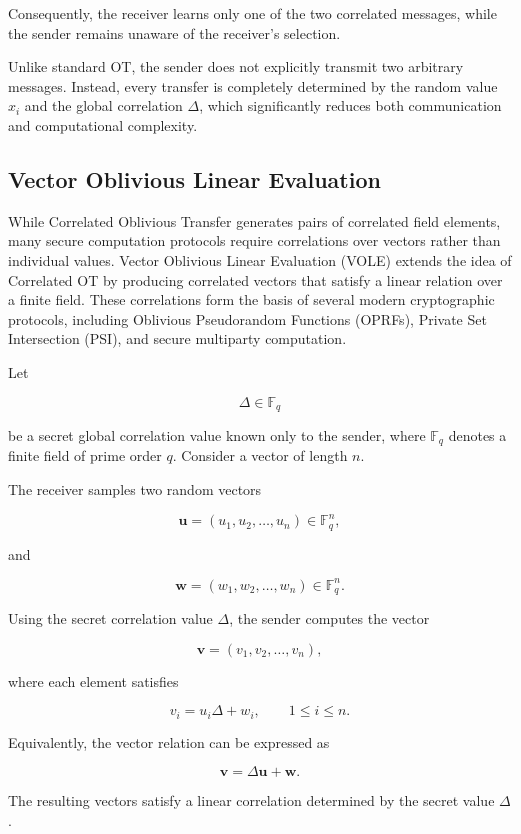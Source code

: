 \documentclass[11pt,a4paper]{article}
\begin{document}
Consequently, the receiver learns only one of the two correlated messages, while the sender remains unaware of the receiver's selection.

Unlike standard OT, the sender does not explicitly transmit two arbitrary messages. Instead, every transfer is completely determined by the random value $x_i$ and the global correlation $\Delta$, which significantly reduces both communication and computational complexity.

\subsection{Vector Oblivious Linear Evaluation}

While Correlated Oblivious Transfer generates pairs of correlated field elements, many secure computation protocols require correlations over vectors rather than individual values. Vector Oblivious Linear Evaluation (VOLE) extends the idea of Correlated OT by producing correlated vectors that satisfy a linear relation over a finite field. These correlations form the basis of several modern cryptographic protocols, including Oblivious Pseudorandom Functions (OPRFs), Private Set Intersection (PSI), and secure multiparty computation.

Let

\[
\Delta \in \mathbb{F}_q
\]

be a secret global correlation value known only to the sender, where $\mathbb{F}_q$ denotes a finite field of prime order $q$. Consider a vector of length $n$.

The receiver samples two random vectors

\[
\mathbf{u}
=
(u_1,u_2,\ldots,u_n)
\in
\mathbb{F}_q^n,
\]

and

\[
\mathbf{w}
=
(w_1,w_2,\ldots,w_n)
\in
\mathbb{F}_q^n.
\]

Using the secret correlation value $\Delta$, the sender computes the vector

\[
\mathbf{v}
=
(v_1,v_2,\ldots,v_n),
\]

where each element satisfies

\[
v_i
=
u_i\Delta+w_i,
\qquad
1\le i\le n.
\]

Equivalently, the vector relation can be expressed as

\[
\mathbf{v}
=
\Delta\mathbf{u}
+
\mathbf{w}.
\]

The resulting vectors satisfy a linear correlation determined by the secret value $\Delta$.
\end{document}
